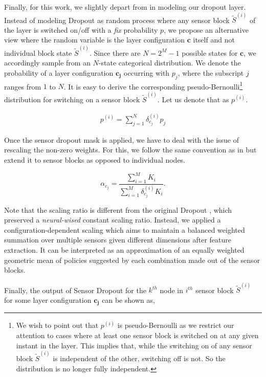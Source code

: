\documentclass[../thesis.tex]{subfiles}
\begin{document}
Finally, for this work, we slightly depart from \citet{dropout} in modeling our dropout layer. Instead of modeling Dropout as random process where any sensor block $\tilde{S}^{(i)}$ of the layer is switched on/off with a \textit{fix} probability $p$, we propose an alternative view where the random variable is the layer configuration $\mathbf{c}$ itself and not individual block state $\tilde{S}^{(i)}$. Since there are $N = 2^M - 1$ possible states for $\mathbf{c}$, we accordingly sample from an $N$-state categorical distribution. We denote the probability of a layer configuration $\mathbf{{c_j}}$ occurring with $p_j$, where the subscript $j$ ranges from $1$ to $N$. It is easy to derive the corresponding pseudo-Bernoulli\footnote{ We wish to point out that $p^{(i)}$ is pseudo-Bernoulli as we restrict our attention to cases where at least one sensor block is switched on at any given instant in the layer. This implies that, while the switching on of any sensor block $\tilde{S}^{(i)}$ is independent of the other, switching off is not. So the distribution is no longer fully independent.} distribution for switching on a sensor block $\tilde{S}^{(i)}$. Let us denote that as $p^{(i)}$. 

\begin{align}
{p}^{(i)} = \sum_{j=1}^N\delta_{c_j}^{(i)} p_j
\end{align}

Once the sensor dropout mask is applied, we have to deal with the issue of rescaling the non-zero weights. For this, we follow the same convention as in \citet{dropout} but extend it to sensor blocks as opposed to individual nodes. 

\begin{equation}
\alpha_{c_j} = \frac{\sum_{i=1}^M K_i }{\sum_{i=1}^M \delta_{c_j}^{(i)} K_i}.
\end{equation}

Note that the scaling ratio is different from the original Dropout \cite{dropout}, which preserved a \textit{neural-wised} constant scaling ratio. Instead, we applied a configuration-dependent scaling which aims to maintain a balanced weighted summation over multiple sensors given different dimensions after feature extraction. It can be interpreted as an approximation of an equally weighted geometric mean of policies suggested by each combination made out of the sensor blocks. 

Finally, the output of Sensor Dropout for the $k^{th}$ node in $i^{th}$ sensor block $\tilde{S}^{(i)}$ for some layer configuration $\mathbf{c_j}$ can be shown as,
\end{document}
